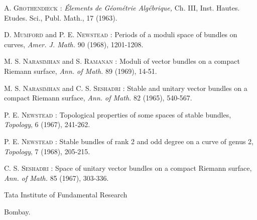 \begin{thebibliography}{99}
 \textsc{A. Grothendieck :} {\em \'Elements de G\'eom\'etrie Alg\'ebrique,} Ch. III, Inst. Hautes. Etudes. Sci., Publ. Math., 17 (1963).

 \textsc{D. Mumford} and \textsc{P. E. Newstead :} Periods of a moduli space of bundles on curves, {\em Amer. J. Math.} 90 (1968), 1201-1208.

 \textsc{M. S. Narasimhan} and \textsc{S. Ramanan :} Moduli of vector bundles on a compact Riemann surface, {\em Ann. of Math.} 89 (1969), 14-51.

 \textsc{M. S. Narasimhan} and \textsc{C. S. Seshadri :} Stable and unitary vector bundles on a compact Riemann surface, {\em Ann. of Math.} 82 (1965), 540-567.

 \textsc{P. E. Newstead :} Topological properties of some spaces of stable bundles, {\em Topology}, 6 (1967), 241-262.

 \textsc{P. E. Newstead :} Stable bundles of rank 2 and odd degree on a curve of genus 2, {\em Topology}, 7 (1968), 205-215.

 \textsc{C. S. Seshadri :} Space of unitary vector bundles on a compact Riemann surface, {\em Ann. of Math.} 85 (1967), 303-336.
\end{thebibliography}

\noindent
Tata Institute of Fundamental Research

\noindent
Bombay.
